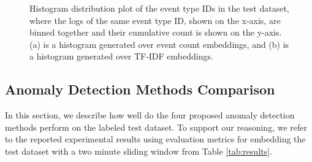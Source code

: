 \begin{figure}[h]%
    \centering
    \qquad
    \caption{Histogram distribution plot of the event type IDs in the test dataset, where the logs of the same event type ID, shown on the x-axis, are binned together and their cumulative count is shown on the y-axis. (a) is a histogram generated over event count embeddings, and (b) is a histogram generated over TF-IDF embeddings.}%
    \label{fig:histogram-event-types}%
\end{figure}


\subsection{Anomaly Detection Methods Comparison}
In this section, we describe how well do the four proposed anomaly detection methods perform on the labeled test dataset. To support our reasoning, we refer to the reported experimental results using evaluation metrics for embedding the test dataset with a two minute sliding window from Table \ref{tab:results}. 

